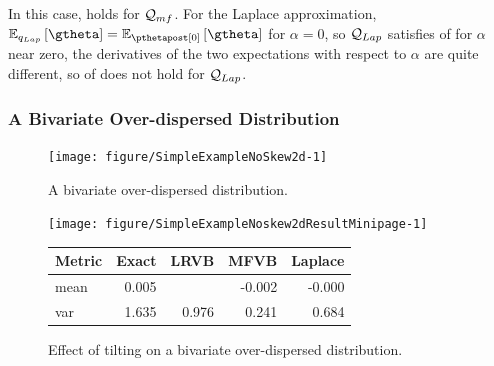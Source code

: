 \documentclass{article}\usepackage[]{graphicx}\usepackage[]{color}
\newenvironment{knitrout}{}{}
\theoremstyle{definition}
\theoremstyle{plain}
\theoremstyle{plain}
\theoremstyle{plain}
\theoremstyle{definition}
\theoremstyle{plain}
\theoremstyle{plain}
\begin{document}
In this case,  holds for $\mathcal{Q}_{mf}$.
For the Laplace approximation, $\mbe_{\lap}\left[\gtheta\right] =
\mbe_{\pzeropost}\left[\gtheta\right]$
for $\alpha=0$, so $\mathcal{Q}_{Lap}$ satisfies  of  for
$\alpha$ near zero,
the derivatives of the two expectations with respect to
$\alpha$ are quite different,
so 
of  does not hold for $\mathcal{Q}_{Lap}$.

\subsubsection{A Bivariate Over-dispersed Distribution}

\begin{knitrout}
\color{fgcolor}\begin{figure}[t]

{\centering \texttt{[image: figure/SimpleExampleNoSkew2d-1]} 

}

\caption[A bivariate over-dispersed distribution]{A bivariate over-dispersed distribution.}\label{fig:SimpleExampleNoSkew2d}
\end{figure}


\end{knitrout}


\begin{figure}
\noindent\begin{minipage}[b]{1\columnwidth}
\begin{minipage}[c][1\totalheight][b]{0.49\columnwidth}\begin{knitrout}
\color{fgcolor}

{\centering \texttt{[image: figure/SimpleExampleNoskew2dResultMinipage-1]} 

}



\end{knitrout}
\end{minipage} \begin{minipage}[b]{0.49\columnwidth}\begin{center}\begin{tabular}{lrrrr}
  \hline
Metric & Exact & LRVB & MFVB & Laplace \\ 
  \hline
mean & 0.005 &  & -0.002 & -0.000 \\ 
  var & 1.635 & 0.976 & 0.241 & 0.684 \\ 
   \hline
\end{tabular}
\end{center}
\end{minipage}


\end{minipage}

\caption{Effect of tilting on a bivariate over-dispersed distribution. \label{fig:SimpleExampleNoSkew2dResult}}
\end{figure}
\end{document}
